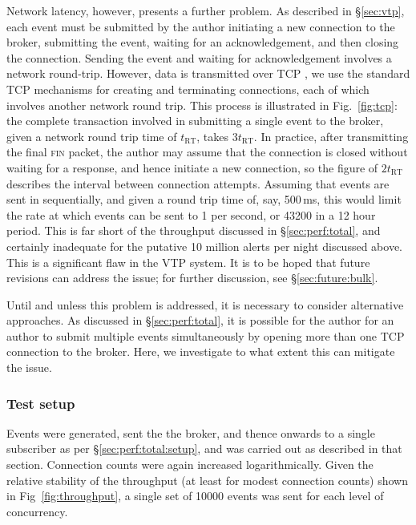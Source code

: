 \documentclass[5p,authoryear]{elsarticle}
\begin{document}
Network latency, however, presents a further problem. As described in
\S\ref{sec:vtp}, each event must be submitted by the author initiating a new
connection to the broker, submitting the event, waiting for an
acknowledgement, and then closing the connection. Sending the event and
waiting for acknowledgement involves a network round-trip.  However, data is
transmitted over TCP \citep{Cerf:1974}, we use the standard TCP mechanisms for
creating and terminating connections, each of which involves another network
round trip. This process is illustrated in Fig.~\ref{fig:tcp}: the complete
transaction involved in submitting a single event to the broker, given a
network round trip time of $t_\mathrm{RT}$, takes $3 t_\mathrm{RT}$. In
practice, after transmitting the final \textsc{fin} packet, the author may
assume that the connection is closed without waiting for a response, and hence
initiate a new connection, so the figure of $2 t_\mathrm{RT}$ describes the
interval between connection attempts.  Assuming that events are sent in
sequentially, and given a round trip time of, say, 500\,ms, this would limit
the rate at which events can be sent to 1 per second, or 43200 in a 12 hour
period. This is far short of the throughput discussed in
\S\ref{sec:perf:total}, and certainly inadequate for the putative 10 million
alerts per night discussed above. This is a significant flaw in the VTP
system. It is to be hoped that future revisions can address the issue; for
further discussion, see \S\ref{sec:future:bulk}.

Until and unless this problem is addressed, it is necessary to consider
alternative approaches. As discussed in \S\ref{sec:perf:total}, it is possible
for the author for an author to submit multiple events simultaneously by
opening more than one TCP connection to the broker. Here, we investigate to
what extent this can mitigate the issue.

\subsubsection{Test setup}

Events were generated, sent the the broker, and thence onwards to a single
subscriber as per \S\ref{sec:perf:total:setup}, and was carried out as
described in that section. Connection counts were again increased
logarithmically.  Given the relative stability of the throughput (at least for
modest connection counts) shown in Fig~\ref{fig:throughput}, a single set of
10000 events was sent for each level of concurrency.
\end{document}
